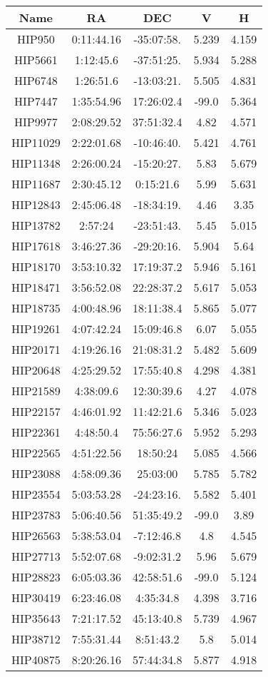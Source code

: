 \begin{table}
\begin{tabular}{ccccc}
\hline \hline
Name & RA & DEC & V & H \\
\hline
HIP950 & 0:11:44.16 & -35:07:58. & 5.239 & 4.159 \\
HIP5661 & 1:12:45.6 & -37:51:25. & 5.934 & 5.288 \\
HIP6748 & 1:26:51.6 & -13:03:21. & 5.505 & 4.831 \\
HIP7447 & 1:35:54.96 & 17:26:02.4 & -99.0 & 5.364 \\
HIP9977 & 2:08:29.52 & 37:51:32.4 & 4.82 & 4.571 \\
HIP11029 & 2:22:01.68 & -10:46:40. & 5.421 & 4.761 \\
HIP11348 & 2:26:00.24 & -15:20:27. & 5.83 & 5.679 \\
HIP11687 & 2:30:45.12 & 0:15:21.6 & 5.99 & 5.631 \\
HIP12843 & 2:45:06.48 & -18:34:19. & 4.46 & 3.35 \\
HIP13782 & 2:57:24 & -23:51:43. & 5.45 & 5.015 \\
HIP17618 & 3:46:27.36 & -29:20:16. & 5.904 & 5.64 \\
HIP18170 & 3:53:10.32 & 17:19:37.2 & 5.946 & 5.161 \\
HIP18471 & 3:56:52.08 & 22:28:37.2 & 5.617 & 5.053 \\
HIP18735 & 4:00:48.96 & 18:11:38.4 & 5.865 & 5.077 \\
HIP19261 & 4:07:42.24 & 15:09:46.8 & 6.07 & 5.055 \\
HIP20171 & 4:19:26.16 & 21:08:31.2 & 5.482 & 5.609 \\
HIP20648 & 4:25:29.52 & 17:55:40.8 & 4.298 & 4.381 \\
HIP21589 & 4:38:09.6 & 12:30:39.6 & 4.27 & 4.078 \\
HIP22157 & 4:46:01.92 & 11:42:21.6 & 5.346 & 5.023 \\
HIP22361 & 4:48:50.4 & 75:56:27.6 & 5.952 & 5.293 \\
HIP22565 & 4:51:22.56 & 18:50:24 & 5.085 & 4.566 \\
HIP23088 & 4:58:09.36 & 25:03:00 & 5.785 & 5.782 \\
HIP23554 & 5:03:53.28 & -24:23:16. & 5.582 & 5.401 \\
HIP23783 & 5:06:40.56 & 51:35:49.2 & -99.0 & 3.89 \\
HIP26563 & 5:38:53.04 & -7:12:46.8 & 4.8 & 4.545 \\
HIP27713 & 5:52:07.68 & -9:02:31.2 & 5.96 & 5.679 \\
HIP28823 & 6:05:03.36 & 42:58:51.6 & -99.0 & 5.124 \\
HIP30419 & 6:23:46.08 & 4:35:34.8 & 4.398 & 3.716 \\
HIP35643 & 7:21:17.52 & 45:13:40.8 & 5.739 & 4.967 \\
HIP38712 & 7:55:31.44 & 8:51:43.2 & 5.8 & 5.014 \\
HIP40875 & 8:20:26.16 & 57:44:34.8 & 5.877 & 4.918 \\
\hline
\end{tabular}
\end{table}
